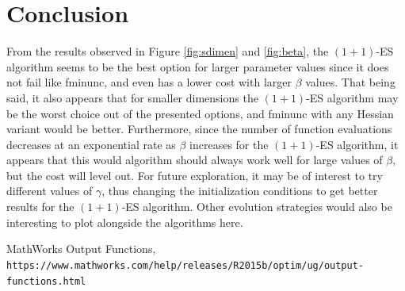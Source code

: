 \documentclass[sigconf, 7pt]{acmart}
\begin{document}
\section{Conclusion}
\label{con}
From the results observed in Figure \ref{fig:sdimen} and \ref{fig:beta}, the $(1+1)$-ES algorithm seems to be the best option for larger parameter values since it does not fail like fminunc, and even has a lower cost with larger $\beta$ values. That being said, it also appears that for smaller dimensions the $(1+1)$-ES algorithm may be the worst choice out of the presented options, and fminunc with any Hessian variant would be better. Furthermore, since the number of function evaluations decreases at an exponential rate as $\beta$ increases for the $(1+1)$-ES algorithm, it appears that this would algorithm should always work well for large values of $\beta$, but the cost will level out. For future exploration, it may be of interest to try different values of $\gamma$, thus changing the initialization conditions to get better results for the $(1+1)$-ES algorithm. Other evolution strategies would also be interesting to plot alongside the algorithms here.

\begin{thebibliography}{9}
MathWorks Output Functions,
\\\texttt{https://www.mathworks.com/help/releases/R2015b/optim/ug/output-functions.html}
\end{thebibliography}
\end{document}
